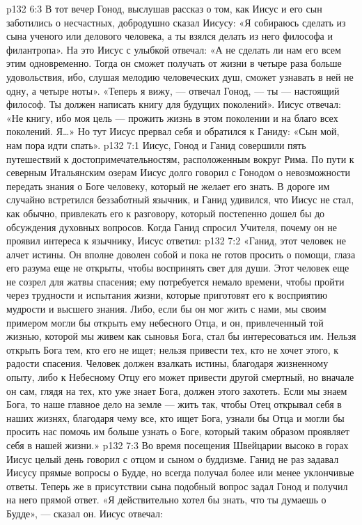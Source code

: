 \vs p132 6:3 \pc В тот вечер Гонод, выслушав рассказ о том, как Иисус и его сын заботились о несчастных, добродушно сказал Иисусу: «Я собираюсь сделать из сына ученого или делового человека, а ты взялся делать из него философа и филантропа». На это Иисус с улыбкой отвечал: «А не сделать ли нам его всем этим одновременно. Тогда он сможет получать от жизни в четыре раза больше удовольствия, ибо, слушая мелодию человеческих душ, сможет узнавать в ней не одну, а четыре ноты». «Теперь я вижу, --- отвечал Гонод, --- ты --- настоящий философ. Ты должен написать книгу для будущих поколений». Иисус отвечал: «Не книгу, ибо моя цель --- прожить жизнь в этом поколении и на благо всех поколений. Я\ldots » Но тут Иисус прервал себя и обратился к Ганиду: «Сын мой, нам пора идти спать».
\vs p132 7:1 Иисус, Гонод и Ганид совершили пять путешествий к достопримечательностям, расположенным вокруг Рима. По пути к северным Итальянским озерам Иисус долго говорил с Гонодом о невозможности передать знания о Боге человеку, который не желает его знать. В дороге им случайно встретился беззаботный язычник, и Ганид удивился, что Иисус не стал, как обычно, привлекать его к разговору, который постепенно дошел бы до обсуждения духовных вопросов. Когда Ганид спросил Учителя, почему он не проявил интереса к язычнику, Иисус ответил:
\vs p132 7:2 \pc «Ганид, этот человек не алчет истины. Он вполне доволен собой и пока не готов просить о помощи, глаза его разума еще не открыты, чтобы воспринять свет для души. Этот человек еще не созрел для жатвы спасения; ему потребуется немало времени, чтобы пройти через трудности и испытания жизни, которые приготовят его к восприятию мудрости и высшего знания. Либо, если бы он мог жить с нами, мы своим примером могли бы открыть ему небесного Отца, и он, привлеченный той жизнью, которой мы живем как сыновья Бога, стал бы интересоваться им. Нельзя открыть Бога тем, кто его не ищет; нельзя привести тех, кто не хочет этого, к радости спасения. Человек должен взалкать истины, благодаря жизненному опыту, либо к Небесному Отцу его может привести другой смертный, но вначале он сам, глядя на тех, кто уже знает Бога, должен этого захотеть. Если мы знаем Бога, то наше главное дело на земле --- жить так, чтобы Отец открывал себя в наших жизнях, благодаря чему все, кто ищет Бога, узнали бы Отца и могли бы просить нас помочь им больше узнать о Боге, который таким образом проявляет себя в нашей жизни.»
\vs p132 7:3 \pc Во время посещения Швейцарии высоко в горах Иисус целый день говорил с отцом и сыном о буддизме. Ганид не раз задавал Иисусу прямые вопросы о Будде, но всегда получал более или менее уклончивые ответы. Теперь же в присутствии сына подобный вопрос задал Гонод и получил на него прямой ответ. «Я действительно хотел бы знать, что ты думаешь о Будде», --- сказал он. Иисус отвечал:

